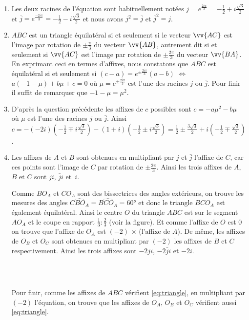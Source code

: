 \documentclass[a4paper,12pt,reqno]{amsart}
\begin{document}
\begin{solution}
  \begin{enumerate}
    \item
    Les deux racines de l'équation sont habituellement notées $j=e^{\frac{2i\pi}{3}}=-\frac{1}{2}+i\frac{\sqrt{3}}{2}$ et $\bar{j}=e^{\frac{-2i\pi}{3}}=-\frac{1}{2}-i\frac{\sqrt{3}}{2}$ et nous avons $j^{2}=\bar{j}$ et $\bar{j}^{2}=j$.
    \begin{center}
      
    \end{center}
    \item $ABC$ est un triangle équilatéral si et seulement si le vecteur $\vv{AC}$ est l'image par rotation de $\pm \frac{\pi}{3}$ du vecteur $\vv{AB}$, autrement dit si et seulement si $\vv{AC}$ est l'image par rotation de $\pm \frac{2\pi}{3}$ du vecteur $\vv{BA}$. En exprimant ceci en termes d'affixes, nous constatons que $ABC$ est équilatéral si et seulement si $(c-a)=e^{\pm\frac{2i\pi}{3}}(a-b)$ $\Leftrightarrow$ $a(-1-\mu)+b\mu+c=0$ où $\mu=e^{\pm\frac{2i\pi}{3}}$ est l'une des racines $j$ ou $\bar{j}$. Pour finir il suffit de remarquer que $-1-\mu=\mu^{2}$.
    \item D'après la question précédente les affixes de $c$ possibles sont $c=-a \mu^{2} - b \mu$ où $\mu$ est l'une des racines $j$ ou $\bar{j}$. Ainsi $c=-(-2i)(-\frac{1}{2}\mp i\frac{\sqrt{3}}{2}) - (1+i) (-\frac{1}{2}\pm i\frac{\sqrt{3}}{2}) = \frac{1}{2} \pm \frac{3\sqrt{3}}{2} + i(-\frac{1}{2}\mp\frac{\sqrt{3}}{2})$.
    \item Les affixes de $A$ et $B$ sont obtenues en multipliant par $j$ et $\bar{j}$ l'affixe de $C$, car ces points sont l'image de $C$ par rotation de $\pm \frac{2\pi}{3}$. Ainsi les trois affixes de $A$, $B$ et $C$ sont $ji$, $\bar{j}i$ et~$i$.\\
    \begin{minipage}[t]{.7\linewidth}
      Comme $BO_{A}$ et $CO_{A}$ sont des bissectrices des angles extérieurs, on trouve les mesures des angles $\widehat{CBO_{A}}=\widehat{BCO_{A}}=60°$ et donc le triangle $BCO_{A}$ est également équilatéral. Ainsi le centre $O$ du triangle $ABC$ est sur le segment $AO_{A}$ et le coupe en rapport $\frac{1}{3}:\frac{2}{3}$ (voir la figure). Et comme l'affixe de $O$ est $0$ on trouve que l'affixe de $O_{A}$ est $(-2)$ $\times$ (l'affixe de $A$). De même, les affixes de $O_{B}$ et $O_{C}$ sont obtenues en multipliant par $(-2)$ les affixes de $B$ et $C$ respectivement. Ainsi les trois affixes sont $-2ji$, $-2\bar{j}i$ et $-2i$.
    \end{minipage}\hfill
    \begin{minipage}[t]{.28\linewidth}~\\[28mm]
      \hspace*{\fill}
      \smash{\scalebox{.7}{}}
    \end{minipage}\\[3mm]
    Pour finir, comme les affixes de $ABC$ vérifient \eqref{eq:triangle}, en  multipliant par $(-2)$ l'équation, on trouve que les affixes de $O_{A}$, $O_{B}$ et $O_{C}$ vérifient aussi \eqref{eq:triangle}.

  \end{enumerate}
\end{solution}
\end{document}
